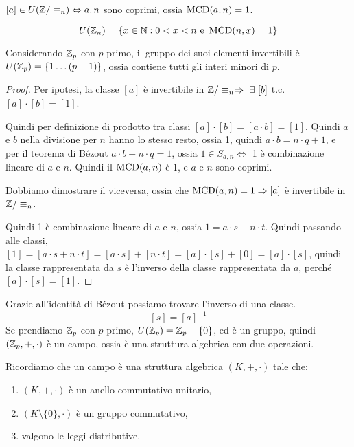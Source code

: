 \begin{prop}
$[a] \in U(\mathbb{Z} / \equiv_n) \Leftrightarrow a, n$ sono coprimi, ossia $\operatorname{MCD}(a, n) = 1$.
\end{prop}

\begin{cor}
\[
U(\mathbb{Z}_n) = \{ x \in \mathbb{N} : 0 < x < n \text{ e } \operatorname{MCD}(n, x) = 1\}
\]
\end{cor}
\begin{oss}
Considerando $\mathbb{Z}_p$ con $p$ primo, il gruppo dei suoi elementi invertibili \`e $U(\mathbb{Z}_p) = \{ 1 \dots (p-1)\}$, ossia contiene tutti gli interi minori di $p$.
\end{oss}
\begin{proof}
Per ipotesi, la classe $[a]$ \`e invertibile in $\integers / \equiv_n \implies \exists [b]$ t.c. $[a] \cdot [b] = [1]$. 

Quindi per definizione di prodotto tra classi $[a] \cdot [b] = [a \cdot b] = [1]$. Quindi $a$ e $b$ nella divisione per $n$ hanno lo stesso resto, ossia 1, quindi $a \cdot b = n \cdot q + 1$, e per il teorema di B\'ezout $a \cdot b - n \cdot q = 1$, ossia $1 \in S_{a, n} \iff$ 1 \`e combinazione lineare di $a$ e $n$. Quindi il $\operatorname{MCD}(a, n) $ \`e $ 1$, e $a$ e $n$ sono coprimi.

Dobbiamo dimostrare il viceversa, ossia che $\operatorname{MCD}(a, n) = 1 \Rightarrow [a]$ \`e invertibile in $\mathbb{Z} / \equiv_n$.

Quindi 1 \`e combinazione lineare di $a$ e $n$, ossia $1 = a \cdot s + n \cdot t$. Quindi passando alle classi, $[1] = [a \cdot s + n \cdot t] = [a \cdot s] + [n \cdot t] = [a] \cdot [s] + [0] = [a] \cdot [s]$, quindi la classe rappresentata da $s$ \`e l'inverso della classe rappresentata da $a$, perch\'e $[a] \cdot [s] = [1]$.
\end{proof}
Grazie all'identit\`a di B\'ezout possiamo trovare l'inverso di una classe.
\[
[s] = [a]^{-1}
\]
Se prendiamo $\mathbb{Z}_p$ con $p$ primo, $U(\mathbb{Z}_p) = \mathbb{Z}_p - \{ 0 \}$, ed \`e un gruppo, quindi $(\mathbb{Z}_p, +, \cdot)$ \`e un campo, ossia \`e una struttura algebrica con due operazioni.

Ricordiamo che un campo \`e una struttura algebrica $(K, +, \cdot)$ tale che:
\begin{enumerate}
    \item $(K, +, \cdot)$ \`e un anello commutativo unitario,
    \item $(K \setminus \{0\}, \cdot)$ \`e un gruppo commutativo,
    \item valgono le leggi distributive.
\end{enumerate}

